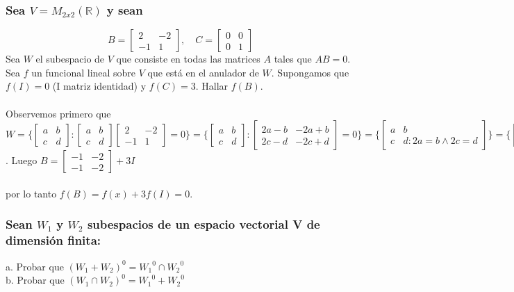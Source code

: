 \documentclass{article}
\begin{document}
\subsubsection{Sea $V = M_{2x2}(\mathbb{R})$ y sean}
\[ 
B = \begin{bmatrix} 2&-2\\-1&1 \end{bmatrix}, \quad C = \begin{bmatrix} 0&0\\0&1 \end{bmatrix}
\]
Sea $W$ el subespacio de $V$ que consiste en todas las matrices $A$ tales que $AB = 0$. Sea $f$ un funcional lineal sobre
$V$ que está en el anulador de $W$. Supongamos que $f(I) = 0$ (I matriz identidad) y $f(C)=3$. Hallar $f(B)$.
\\ \\
Observemos primero que $W = \Bigg \{ \begin{bmatrix} a&b \\ c&d \end{bmatrix} : \begin{bmatrix}a&b\\c&d\end{bmatrix}
\begin{bmatrix} 2&-2\\-1&1\end{bmatrix} = 0 \Bigg \} = \Bigg \{ \begin{bmatrix} a&b\\c&d\end{bmatrix} :
\begin{bmatrix} 2a-b&-2a+b \\ 2c-d & -2c+d \end{bmatrix} = 0 \Bigg \} = 
\Bigg \{ \begin{bmatrix} a&b\\c&d : 2a=b \wedge 2c=d \end{bmatrix}   \Bigg \} = \Bigg \{ \begin{bmatrix} 
a&2a \\ c&2c \end{bmatrix} : a,c \in \mathbb{R} \Bigg \}$. Luego $B = \begin{bmatrix}  -1&-2\\-1&-2\end{bmatrix}+3I$ \\ \\
por lo tanto $f(B)=f(x)+3f(I)=0$.

\subsubsection{Sean $W_1$ y $W_2$ subespacios de un espacio vectorial V de dimensión finita: }
a. Probar que $(W_1 + W_2)^0 = {W_1}^0 \cap {W_2}^0$ \\
b. Probar que $(W_1 \cap W_2)^0 = {W_1}^0 + {W_2}^0$
\end{document}
